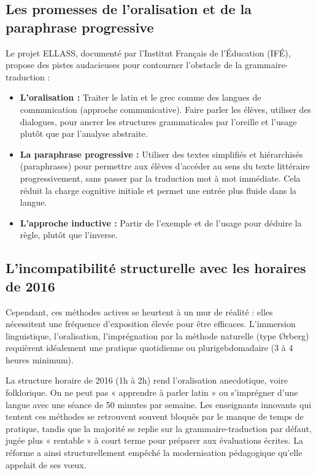 \subsection{Les promesses de l'oralisation et de la paraphrase progressive}

Le projet ELLASS, documenté par l'Institut Français de l'Éducation (IFÉ), propose des pistes
audacieuses pour contourner l'obstacle de la grammaire-traduction :

\begin{itemize}\item \textbf{L'oralisation :} Traiter le latin et le grec comme des langues de communication (approche communicative). Faire parler les élèves, utiliser des dialogues, pour ancrer les structures grammaticales par l'oreille et l'usage plutôt que par l'analyse abstraite.\item \textbf{La paraphrase progressive :} Utiliser des textes simplifiés et hiérarchisés (paraphrases) pour permettre aux élèves d'accéder au sens du texte littéraire progressivement, sans passer par la traduction mot à mot immédiate.\cite{I-3-2-ref32} Cela réduit la charge cognitive initiale et permet une entrée plus fluide dans la langue.\item \textbf{L'approche inductive :} Partir de l'exemple et de l'usage pour déduire la règle, plutôt que l'inverse.\end{itemize}

\subsection{L'incompatibilité structurelle avec les horaires de 2016}

Cependant, ces méthodes actives se heurtent à un mur de réalité : elles nécessitent une fréquence
d'exposition élevée pour être efficaces. L'immersion linguistique, l'oralisation, l'imprégnation par
la méthode naturelle (type Ørberg) requièrent idéalement une pratique quotidienne ou
plurigebdomadaire (3 à 4 heures minimum).

La structure horaire de 2016 (1h à 2h) rend l'oralisation anecdotique, voire folklorique. On ne peut
pas « apprendre à parler latin » ou s'imprégner d'une langue avec une séance de 50 minutes par
semaine. Les enseignants innovants qui tentent ces méthodes se retrouvent souvent bloqués par le
manque de temps de pratique, tandis que la majorité se replie sur la grammaire-traduction par
défaut, jugée plus « rentable » à court terme pour préparer aux évaluations
écrites.\cite{I-3-2-ref33} La réforme a ainsi structurellement empêché la modernisation pédagogique
qu'elle appelait de ses vœux.

